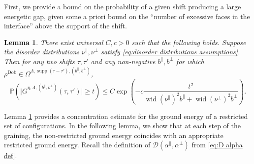 \documentclass[11pt, reqno]{amsart}
\newtheorem{lemma}[theorem]{Lemma}
\DeclareMathOperator{\supp}{supp}
\DeclareMathOperator{\Dob}{Dob}
\renewcommand{\P}{\mathbb{P}}
\DeclareMathOperator{\wid}{wid}
\numberwithin{equation}{section}
\begin{document}
First, we provide a bound on the probability of a given shift producing a large energetic gap, given some a priori bound on the ``number of excessive faces in the interface'' above the support of the shift.
\begin{lemma}\label{lem:concentration for energetic gain conditioned on layering bound}
There exist universal $C,c>0$ such that the following holds. Suppose the disorder distributions $\nu^{\parallel},\nu^{\perp}$ satisfy \eqref{eq:disorder distributions assumptions}.
Then for any two shifts $\tau,\tau'$ and any non-negative $b^{\parallel},b^{\perp}$ for which $\rho^{\Dob}\in\Omega^{\Lambda,\supp(\tau-\tau'),(b^{\parallel},b^{\perp})}$,
\begin{equation}\label{eq:two point estimate}
\P\left(\lvert G^{\eta, \Lambda,(b^{\parallel},b^{\perp})} (\tau,\tau') \rvert \ge t\right)\le
C\exp \left(-c \frac{t^2}{\wid (\nu^{\parallel})^{2}  b^{\parallel}+\wid (\nu^{\perp})^{2} b^{\perp}} \right).
\end{equation} 
\end{lemma}

Lemma \ref{lem:concentration for energetic gain conditioned on layering bound} provides a concentration estimate for the ground energy of a restricted set of configurations. In the following lemma, we show that at each step of the graining, the non-restricted ground energy coincides with an appropriate restricted ground energy.   
Recall the definition of $\mathcal{D}(\alpha^{\parallel},\alpha^{\perp})$ from \eqref{eq:D alpha def}.
\end{document}

